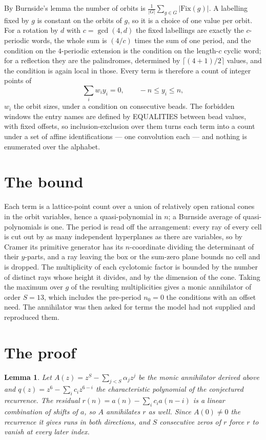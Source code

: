\documentclass[11pt,a4paper]{article}
\theoremstyle{plain}
\newtheorem{lemma}[theorem]{Lemma}
\theoremstyle{definition}
\begin{document}
By Burnside's lemma the number of orbits is $\frac{1}{|G|}\sum_{g\in G}|\mathrm{Fix}(g)|$.
A labelling fixed by $g$ is constant on the orbits of $g$, so it is a choice of one value per
orbit. For a rotation by $d$ with $c=\gcd(4,d)$ the fixed labellings are exactly the
$c$-periodic words, the whole sum is $(4/c)$ times the sum of one period, and the condition on
the $4$-periodic extension is the condition on the length-$c$ cyclic word; for a reflection
they are the palindromes, determined by $\lceil(4+1)/2\rceil$ values, and the condition is
again local in those. Every term is therefore a count of integer points of
\[
\sum_i w_i y_i = 0, \qquad -n \le y_i \le n,
\]
$w_i$ the orbit sizes, under a condition on consecutive beads. The forbidden windows the entry
names are defined by EQUALITIES between bead values, with fixed offsets, so inclusion-exclusion
over them turns each term into a count under a set of affine identifications --- one
convolution each --- and nothing is enumerated over the alphabet.

\section{The bound}

Each term is a lattice-point count over a union of relatively open rational cones in the orbit
variables, hence a quasi-polynomial in $n$; a Burnside average of quasi-polynomials is one. The
period is read off the arrangement: every ray of every cell is cut out by as many independent
hyperplanes as there are variables, so by Cramer its primitive generator has its $n$-coordinate
dividing the determinant of their $y$-parts, and a ray leaving the box or the sum-zero plane
bounds no cell and is dropped. The multiplicity of each cyclotomic factor is bounded by the
number of distinct rays whose height it divides, and by the dimension of the cone. Taking the
maximum over $g$ of the resulting multiplicities gives a monic annihilator of order
$S=13$, which includes the pre-period $n_0=0$ the conditions with an offset need. The
annihilator was then asked for terms the model had not supplied and reproduced them.

\section{The proof}

\begin{lemma}\label{lem:crit}
Let $A(z)=z^S-\sum_{j<S}\alpha_jz^{j}$ be the monic annihilator derived above and
$q(z)=z^{6}-\sum_ic_iz^{6-i}$ the characteristic polynomial of the conjectured
recurrence. The residual $r(n)=a(n)-\sum_ic_ia(n-i)$ is a linear combination of shifts of $a$,
so $A$ annihilates $r$ as well. Since $A(0)\ne0$ the recurrence it gives runs in both
directions, and $S$ consecutive zeros of $r$ force $r$ to vanish at every later index.
\end{lemma}
\end{document}
